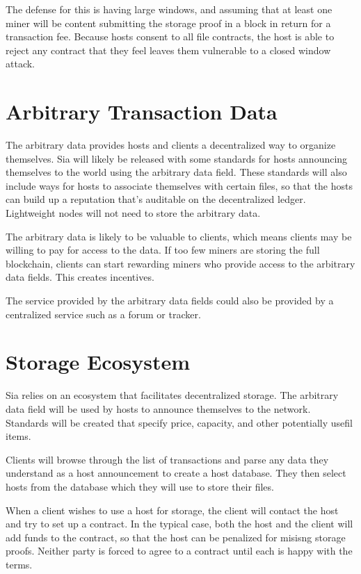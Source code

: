 \documentclass[twocolumn]{article}
\begin{document}
The defense for this is having large windows, and assuming that at least one miner will be content submitting the storage proof in a block in return for a transaction fee.
Because hosts consent to all file contracts, the host is able to reject any contract that they feel leaves them vulnerable to a closed window attack.

\section{Arbitrary Transaction Data}
The arbitrary data provides hosts and clients a decentralized way to organize themselves.
Sia will likely be released with some standards for hosts announcing themselves to the world using the arbitrary data field.
These standards will also include ways for hosts to associate themselves with certain files, so that the hosts can build up a reputation that's auditable on the decentralized ledger.
Lightweight nodes will not need to store the arbitrary data.

The arbitrary data is likely to be valuable to clients, which means clients may be willing to pay for access to the data.
If too few miners are storing the full blockchain, clients can start rewarding miners who provide access to the arbitrary data fields.
This creates incentives.

The service provided by the arbitrary data fields could also be provided by a centralized service such as a forum or tracker.

\section{Storage Ecosystem}
Sia relies on an ecosystem that facilitates decentralized storage.
The arbitrary data field will be used by hosts to announce themselves to the network.
Standards will be created that specify price, capacity, and other potentially usefil items.

Clients will browse through the list of transactions and parse any data they understand as a host announcement to create a host database.
They then select hosts from the database which they will use to store their files.

When a client wishes to use a host for storage, the client will contact the host and try to set up a contract.
In the typical case, both the host and the client will add funds to the contract, so that the host can be penalized for misisng storage proofs.
Neither party is forced to agree to a contract until each is happy with the terms.
\end{document}
